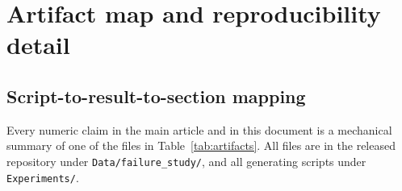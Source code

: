 \documentclass[preprint,11pt]{elsarticle}
\begin{document}
\section{Artifact map and reproducibility detail}
\label{si:artifacts}

\subsection{Script-to-result-to-section mapping}

Every numeric claim in the main article and in this document is a
mechanical summary of one of the files in Table~\ref{tab:artifacts}. All
files are in the released repository under
\texttt{Data/failure\_study/}, and all generating scripts under
\texttt{Experiments/}.
\end{document}
